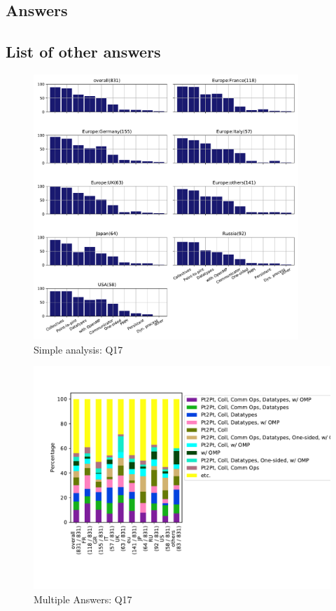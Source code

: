 
\subsection{Answers}



\subsection{List of other answers}
\begin{itemize}

\end{itemize}

\begin{figure}[htb]
\begin{center}
\includegraphics[width=10cm]{../pdfs/Q17.pdf}
\caption{Simple analysis: Q17}
\label{fig:Q17}
\end{center}
\end{figure}

\begin{figure}[htb]
\begin{center}
\includegraphics[width=14cm]{../pdfs/Q17-mans.pdf}
\caption{Multiple Answers: Q17}
\label{fig:Q17-mans}
\end{center}
\end{figure}

